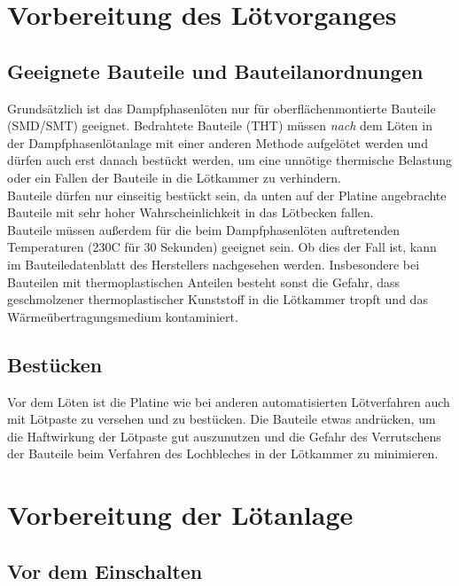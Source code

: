 \documentclass{\basedir/fablab-document}
\begin{document}
	\section{Vorbereitung des L{\"o}tvorganges}
	\subsection{Geeignete Bauteile und Bauteilanordnungen}
	
	
	Grunds{\"a}tzlich ist das Dampfphasenl{\"o}ten nur f{\"u}r oberfl{\"a}chenmontierte Bauteile (SMD/SMT) geeignet. Bedrahtete Bauteile (THT) m{\"u}ssen \textit{nach} dem L{\"o}ten in der Dampfphasenl{\"o}tanlage mit einer anderen Methode aufgel{\"o}tet werden und d{\"u}rfen auch erst danach best{\"u}ckt werden, um eine unn{\"o}tige thermische Belastung oder ein Fallen der Bauteile in die L{\"o}tkammer zu verhindern.\\

Bauteile d{\"u}rfen nur einseitig best{\"u}ckt sein, da unten auf der Platine angebrachte Bauteile mit sehr hoher Wahrscheinlichkeit in das L{\"o}tbecken fallen. \\

Bauteile m{\"u}ssen au{\ss}erdem f{\"u}r die beim Dampfphasenl{\"o}ten auftretenden Temperaturen (230\textdegree C f{\"u}r 30 Sekunden) geeignet sein. Ob dies der Fall ist, kann im Bauteiledatenblatt des Herstellers nachgesehen werden. Insbesondere bei Bauteilen mit thermoplastischen Anteilen besteht sonst die Gefahr, dass geschmolzener thermoplastischer Kunststoff in die L{\"o}tkammer tropft und das W{\"a}rme{\"u}bertragungsmedium kontaminiert.


\subsection{Best{\"u}cken}

Vor dem L{\"o}ten ist die Platine wie bei anderen automatisierten L{\"o}tverfahren auch mit L{\"o}tpaste zu versehen und zu best{\"u}cken. Die Bauteile etwas andr{\"u}cken, um die Haftwirkung der L{\"o}tpaste gut auszunutzen und die Gefahr des Verrutschens der Bauteile beim Verfahren des Lochbleches in der L{\"o}tkammer zu minimieren.

\section{Vorbereitung der L{\"o}tanlage}
\subsection{Vor dem Einschalten}
\end{document}
